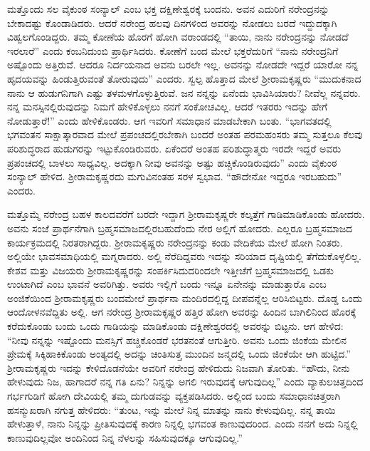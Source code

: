 ಮತ್ತೊಂದು ಸಲ ವೈಕುಂಠ ಸಂನ್ಯಾಲ್ ಎಂಬ ಭಕ್ತ ದಕ್ಷಿಣೇಶ್ವರಕ್ಕೆ ಬಂದನು. ಅವನ ಎದುರಿಗೆ ನರೇಂದ್ರನನ್ನು ಬೇಕಾದಷ್ಟು ಕೊಂಡಾಡಿದರು. ಆದರೆ ನರೇಂದ್ರ ಹಲವು ದಿನಗಳಿಂದ ಅವರನ್ನು ನೋಡಲು ಬರದೆ ಇದ್ದುದಕ್ಕಾಗಿ ವಿಹ್ವಲಗೊಂಡಿದ್ದರು. ತಮ್ಮ ಕೋಣೆಯ ಹೊರಗೆ ಹೋಗಿ ವರಾಂಡದಲ್ಲಿ “ತಾಯಿ, ನಾನು ನರೇಂದ್ರನನ್ನು ನೋಡದೆ ಇರಲಾರೆ” ಎಂದು ಕಂಬನಿದುಂಬಿ ಪ್ರಾರ್ಥಿಸಿದರು. ಕೋಣೆಗೆ ಬಂದ ಮೇಲೆ ಭಕ್ತರೆದುರಿಗೆ “ನಾನು ನರೇಂದ್ರನಿಗೆ ಅಷ್ಟೊಂದು ಅತ್ತಿರುವೆ. ಆದರೂ ನಿರ್ದಯನಾದ ಅವನು ಬರಲೇ ಇಲ್ಲ. ಅವನನ್ನು ನೋಡದೇ ಇದ್ದರೆ ಯಾರೋ ನನ್ನ ಹೃದಯವನ್ನು ಹಿಂಡುತ್ತಿರುವಂತೆ ತೋರುವುದು” ಎಂದರು. ಸ್ವಲ್ಪ ಹೊತ್ತಾದ ಮೇಲೆ ಶ‍್ರೀರಾಮಕೃಷ್ಣರು “ಮುದುಕನಾದ ನಾನು ಆ ಹುಡುಗನಿಗಾಗಿ ಎಷ್ಟು ತಳಮಳಗೊಳ್ಳುತ್ತಿರುವೆ. ಜನ ನನ್ನನ್ನು ಏನೆಂದು ಭಾವಿಸಿಯಾರು? ನೀವೆಲ್ಲ ನನ್ನವರು. ನನ್ನ ಮನಸ್ಸಿನಲ್ಲಿರುವುದನ್ನು ನಿಮಗೆ ಹೇಳಿಕೊಳ್ಳಲು ನನಗೆ ಸಂಕೋಚವಿಲ್ಲ. ಆದರೆ ಇತರರು ಇದನ್ನು ಹೇಗೆ ನೋಡುತ್ತಾರೆ!” ಎಂದು ಹೇಳಿಕೊಂಡರು. ಆಗ ಇವರಿಗೆ ಸಮಾಧಾನ ಮಾಡಬೇಕಾಗಿ ಬಂತು. “ಭಾಗವತದಲ್ಲಿ ಭಗವಂತನ ಸಾಕ್ಷಾತ್ಕಾರವಾದ ಮೇಲೆ ಪ್ರಪಂಚದಲ್ಲಿರಬೇಕಾಗಿ ಬಂದರೆ ಅಂತಹ ಪರಮಹಂಸರು ತಮ್ಮ ಸುತ್ತಲೂ ಕೆಲವು ಪರಿಶುದ್ಧರಾದ ಹುಡುಗರನ್ನು ಇಟ್ಟುಕೊಂಡಿರುವರು. ಏಕೆಂದರೆ ಅಂತಹ ಪರಿಶುದ್ಧಾತ್ಮರು ಇರದೇ ಇದ್ದರೆ ಅವರು ಪ್ರಪಂಚದಲ್ಲಿ ಬಾಳಲು ಸಾಧ್ಯವಿಲ್ಲ. ಅದಕ್ಕಾಗಿ ನೀವು ಅವನನ್ನು ಅಷ್ಟು ಹಚ್ಚಿಕೊಂಡಿರುವುದು” ಎಂದು ವೈಕುಂಠ ಸಂನ್ಯಾಲ್ ಹೇಳಿದ. ಶ‍್ರೀರಾಮಕೃಷ್ಣರದು ಮಗುವಿನಂತಹ ಸರಳ ಸ್ವಭಾವ. “ಹೌದೇನೋ ಇದ್ದರೂ ಇರಬಹುದು” ಎಂದರು.

ಮತ್ತೊಮ್ಮೆ ನರೇಂದ್ರ ಬಹಳ ಕಾಲದವರೆಗೆ ಬರದೇ ಇದ್ದಾಗ ಶ‍್ರೀರಾಮಕೃಷ್ಣರೇ ಕಲ್ಕತ್ತೆಗೆ ಗಾಡಿಮಾಡಿಕೊಂಡು ಹೋದರು. ಅವನು ಸಂಜೆ ಪ್ರಾರ್ಥನೆಗಾಗಿ ಬ್ರಹ್ಮಸಮಾಜದಲ್ಲಿರಬಹುದೆಂದು ನೇರ ಅಲ್ಲಿಗೆ ಹೋದರು. ಎಲ್ಲರೂ ಬ್ರಹ್ಮಸಮಾಜದ ಕಾರ್ಯಕ್ರಮದಲ್ಲಿ ನಿರತರಾಗಿದ್ದರು. ಶ‍್ರೀರಾಮಕೃಷ್ಣರು ನರೇಂದ್ರನನ್ನು ಕಂಡು ವೇದಿಕೆಯ ಮೇಲೆ ಹೋಗಿ ನಿಂತರು. ಅಲ್ಲಿಯೇ ಭಾವಸಮಾಧಿಯಲ್ಲಿ ಮಗ್ನರಾದರು. ಅಲ್ಲಿ ನೆರೆದಿದ್ದವರು ಇದನ್ನು ಸರಿಯಾದ ದೃಷ್ಟಿಯಲ್ಲಿ ತೆಗೆದುಕೊಳ್ಳಲಿಲ್ಲ. ಕೇಶವ ಮತ್ತು ವಿಜಯರು ಶ‍್ರೀರಾಮಕೃಷ್ಣರನ್ನು ಸಂಪರ್ಕಿಸಿದುದರಿಂದಲೇ ಇತ್ತೀಚೆಗೆ ಬ್ರಹ್ಮಸಮಾಜದಲ್ಲಿ ಒಡಕು ಉಂಟಾಗಿದೆ ಎಂಬ ಭಾವನೆ ಅವರಿಗಿತ್ತು. ಅವರು ಇಲ್ಲಿಗೆ ಬಂದು ಇನ್ನೂ ಏನೇನನ್ನು ಮಾಡುತ್ತಾರೊ ಎಂಬ ಅಂಜಿಕೆಯಿಂದ ಶ‍್ರೀರಾಮಕೃಷ್ಣರು ಬಂದಮೇಲೆ ಪ್ರಾರ್ಥನಾ ಮಂದಿರದಲ್ಲಿದ್ದ ದೀಪವನ್ನೆಲ್ಲ ಆರಿಸಿಬಿಟ್ಟರು. ದೊಡ್ಡ ಒಂದು ಆಂದೋಳನವೆದ್ದಿತು ಅಲ್ಲಿ. ಆಗ ನರೇಂದ್ರ ಶ‍್ರೀರಾಮಕೃಷ್ಣರ ಹತ್ತಿರ ಹೋಗಿ ಅವರನ್ನು ಹಿಂದಿನ ಬಾಗಿಲಿನಿಂದ ಹೊರಕ್ಕೆ ಕರೆದುಕೊಂಡು ಬಂದು ಒಂದು ಗಾಡಿಯನ್ನು ಮಾಡಿಕೊಂಡು ದಕ್ಷಿಣೇಶ್ವರದಲ್ಲಿ ಅವರನ್ನು ಬಿಟ್ಟನು. ಆಗ ಹೇಳಿದ: “ನೀವು ನನ್ನನ್ನು ಇಷ್ಟೊಂದು ಮನಸ್ಸಿಗೆ ಹಚ್ಚಿಕೊಂಡರೆ ಭರತನಂತೆ ಆಗುತ್ತೀರಿ. ಅವನು ಒಂದು ಜಿಂಕೆಯ ಮೇಲಿನ ಪ್ರೇಮಕ್ಕೆ ಸಿಕ್ಕಿಹಾಕಿಕೊಂಡು ಅಂತ್ಯದಲ್ಲಿ ಅದನ್ನು ಚಿಂತಿಸುತ್ತ ಮುಂದಿನ ಜನ್ಮದಲ್ಲಿ ಒಂದು ಜಿಂಕೆಯೇ ಆಗಿ ಹುಟ್ಟಿದ.” ಶ‍್ರೀರಾಮಕೃಷ್ಣರು ಇದನ್ನು ಕೇಳಿದೊಡನೆಯೇ ಅವರಿಗೆ ನರೇಂದ್ರ ಹೇಳಿದುದು ನಿಜವಾಗಿ ತೋರಿತು. “ಹೌದು, ನೀನು ಹೇಳುವುದು ನಿಜ, ಹಾಗಾದರೆ ನನ್ನ ಗತಿ ಏನು? ನಿನ್ನನ್ನು ಅಗಲಿ ಇರುವುದಕ್ಕೆ ಆಗುವುದಿಲ್ಲ” ಎಂದು ವ್ಯಾಕುಲಚಿತ್ತದಿಂದ ಗರ್ಭಗುಡಿಗೆ ಹೋಗಿ ದೇವಿಯಲ್ಲಿ ತಮ್ಮ ದುಗುಡವನ್ನು ವ್ಯಕ್ತಪಡಿಸಿದರು. ಅಲ್ಲಿಂದ ಬಂದು ಸಮಾಧಾನಚಿತ್ತರಾಗಿ ಹಸನ್ಮುಖರಾಗಿ ನಗುತ್ತ ಹೇಳಿದರು: “ತುಂಟ, ಇನ್ನು ಮೇಲೆ ನಿನ್ನ ಮಾತನ್ನು ನಾನು ಕೇಳುವುದಿಲ್ಲ. ನನ್ನ ತಾಯಿ ಹೇಳುತ್ತಾಳೆ, ನಾನು ನಿನ್ನನ್ನು ಪ್ರೀತಿಸುವುದಕ್ಕೆ ಕಾರಣ ನಿನ್ನಲ್ಲಿ ಭಗವಂತ ಕಾಣುವುದರಿಂದ. ಎಂದು ನನಗೆ ಅದು ನಿನ್ನಲ್ಲಿ ಕಾಣುವುದಿಲ್ಲವೋ ಅಂದಿನಿಂದ ನಿನ್ನ ನೆಳಲನ್ನು ಸಹಿಸುವುದಕ್ಕೂ ಆಗುವುದಿಲ್ಲ.”

